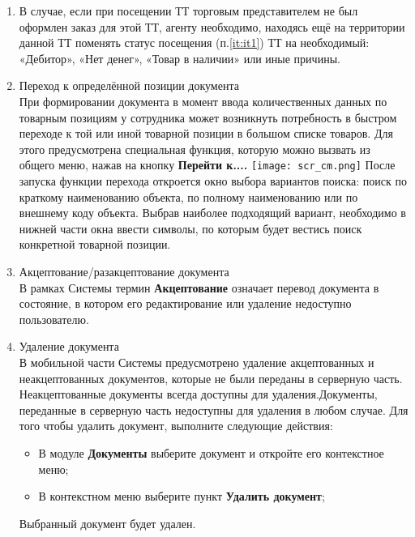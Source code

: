 \begin{enumerate}[\thesection .1]
\item В случае, если при посещении ТТ торговым представителем не был оформлен заказ для этой ТТ, агенту необходимо, находясь ещё на территории данной ТТ поменять статус посещения (п.\ref{it:it1}) ТТ на необходимый: «Дебитор», «Нет денег», «Товар в наличии» или иные причины.
\item Переход к определённой позиции документа\\
При формировании документа в момент ввода количественных данных по товарным позициям у сотрудника может возникнуть потребность в быстром переходе к той или иной товарной позиции в большом списке товаров. Для этого предусмотрена специальная функция, которую можно вызвать из общего меню, нажав на кнопку \textbf{Перейти к....} 
\texttt{[image: scr\_cm.png]} 
После запуска функции перехода откроется окно выбора вариантов поиска: поиск по краткому наименованию объекта, по полному наименованию или по внешнему коду объекта. Выбрав наиболее подходящий вариант, необходимо в нижней части окна ввести символы, по которым будет вестись поиск конкретной товарной позиции.
\item Акцептование/разакцептование документа\\
В рамках Системы термин \textbf{Акцептование} означает перевод документа в состояние, в котором его редактирование или удаление недоступно пользователю. 
\item Удаление документа\\
В мобильной части Системы предусмотрено удаление акцептованных и неакцептованных документов, которые не были переданы в серверную часть. Неакцептованные документы всегда доступны для удаления.Документы, переданные в серверную часть недоступны для удаления в любом случае.
Для того чтобы удалить документ, выполните следующие действия:
\begin{itemize}
	\item В модуле \textbf{Документы} выберите документ и откройте его контекстное меню;
	\item В контекстном меню выберите пункт \textbf{Удалить документ};
\end{itemize}
Выбранный документ будет удален.
\end{enumerate}